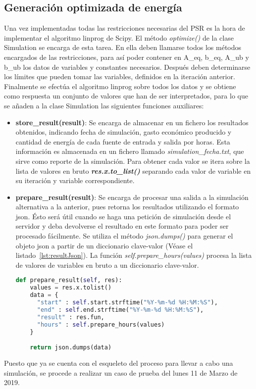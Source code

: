 \subsection{Generación optimizada de energía}
Una vez implementadas todas las restricciones necesarias del PSR es la hora de implementar el algoritmo linprog de Scipy. El método \textit{optimize()} de la clase Simulation se encarga de esta tarea. En ella deben llamarse todos los métodos encargados de las restricciones, para así poder contener en A\_eq, b\_eq, A\_ub y b\_ub los datos de variables y constantes necesarios. Después deben determinarse los límites que pueden tomar las variables, definidos en la iteración anterior. Finalmente se efectúa el algoritmo linprog sobre todos los datos y se obtiene como respuesta un conjunto de valores que han de ser interpretados, para lo que se añaden a la clase Simulation las siguientes funciones auxiliares:
\begin{itemize}
\item \textbf{store\_result(result)}: Se encarga de almacenar en un fichero los resultados obtenidos, indicando fecha de simulación, gasto económico producido y cantidad de energía de cada fuente de entrada y salida por horas. Esta información es almacenada en un fichero llamado \textit{simulation\_fecha.txt}, que sirve como reporte de la simulación. Para obtener cada valor se itera sobre la lista de valores en bruto \textbf{\textit{res.x.to\_list()}} separando cada valor de variable en su iteración y variable correspondiente.
\item \textbf{prepare\_result(result)}: Se encarga de procesar una salida a la simulación alternativa a la anterior, pues retorna los resultados utilizando el formato json. Ésto será útil cuando se haga una petición de simulación desde el servidor y deba devolverse el resultado en este formato para poder ser procesado fácilmente. Se utiliza el método \textit{json.dumps()} para generar el objeto json a partir de un diccionario clave-valor (Véase el listado~\ref{lst:resultJson}). La función \textit{self.prepare\_hours(values)} procesa la lista de valores de variables en bruto a un diccionario clave-valor.
\begin{lstlisting}[language=Python,float=ht,caption={Función de procesamiento del resultado a formato json},label={lst:resultJson}]
def prepare_result(self, res):
    values = res.x.tolist()
    data = {
      "start" : self.start.strftime("%Y-%m-%d %H:%M:%S"),
      "end" : self.end.strftime("%Y-%m-%d %H:%M:%S"),
      "result" : res.fun,
      "hours" : self.prepare_hours(values)
    }

    return json.dumps(data)
\end{lstlisting}
\end{itemize}
Puesto que ya se cuenta con el esqueleto del proceso para llevar a cabo una simulación, se procede a realizar un caso de prueba del lunes 11 de Marzo de 2019.
